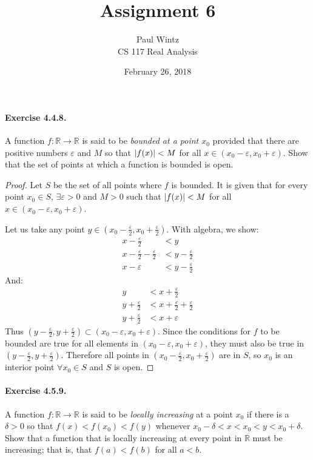 \documentclass[11pt]{article}
\title{Assignment 6}
\author{Paul Wintz\\CS 117 Real Analysis}
\date{February 26, 2018}
\DeclarePairedDelimiter{\abs}{\lvert}{\rvert}
\def \R {\mathbb{R}}
\def \epsilon {\varepsilon}
\def \halfepsilon{\frac{\epsilon}{2}}
\begin{document}
\maketitle


\paragraph{Exercise 4.4.8.} A function $f: \R \rightarrow \R$ is said to be \textit{bounded at a point $x_0$} provided that there are positive numbers $\epsilon$ and $M$ so that $\abs{f(x)} < M$ for all $x \in (x_0 - \epsilon, x_0 + \epsilon)$. 
Show that the set of points at which a function is bounded is open.

\begin{proof}
	Let $S$ be the set of all points where $f$ is bounded. It is given that for every point $x_0 \in S$, $\exists \epsilon >0$ and $M > 0$ such that $\abs{f(x)} < M$ for all $x \in (x_0 - \epsilon, x_0 + \epsilon)$. 
	
	Let us take any point $y \in (x_0 - \halfepsilon, x_0 + \halfepsilon)$. With algebra, we show:
	\begin{align*}
		x - \halfepsilon &< y \\
		x - \halfepsilon - \halfepsilon &< y - \halfepsilon \\
		x - \epsilon &< y - \halfepsilon
	\end{align*}	
	And: 
	\begin{align*}
	y &< x + \halfepsilon\\
	y + \halfepsilon &< x + \halfepsilon + \halfepsilon\\
	y + \halfepsilon &< x + \epsilon
	\end{align*}
	 Thus $(y - \halfepsilon, y + \halfepsilon) \subset (x_0 - \epsilon, x_0 + \epsilon)$. Since the conditions for $f$ to be bounded are true for all elements in $(x_0 - \epsilon, x_0 + \epsilon)$, they must also be true in $(y - \halfepsilon, y + \halfepsilon)$. Therefore all points in $(x_0 - \halfepsilon, x_0 + \halfepsilon)$ are in $S$, so $x_0$ is an interior point $\forall x_0 \in S$ and $S$ is open.
\end{proof}

\paragraph{Exercise 4.5.9.} A function $f: \R \rightarrow \R$ is said to be \textit{locally increasing} at a point $x_0$ if there is a $\delta > 0$ so that $f(x) < f(x_0) < f(y)$ whenever $x_0 - \delta < x < x_0 < y < x_0 + \delta.$ Show that a function that is locally increasing at every point in $\R$ must be increasing; that is, that $f(a) < f(b)$ for all $a < b$.
\end{document}
